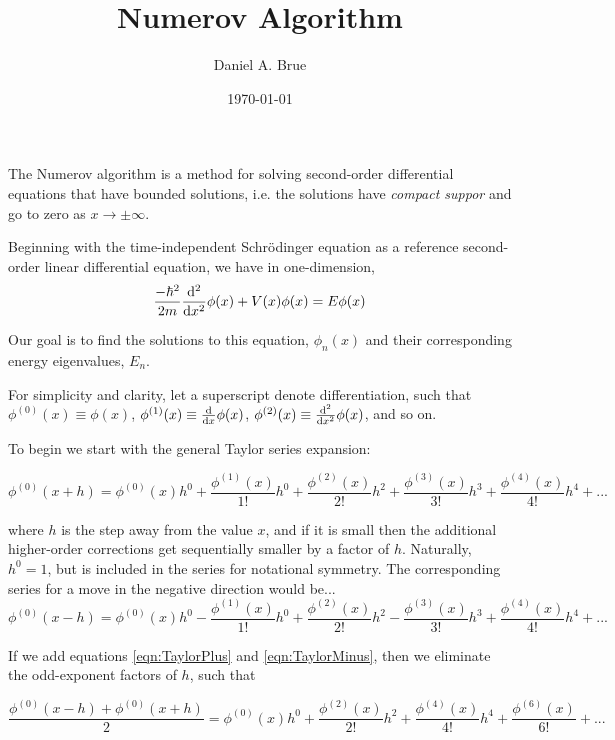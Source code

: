 \documentclass[preprint]{revtex4}
\newcommand{\difx}{\frac{{\rm d}}{{\rm d}x}}
\newcommand{\difxsq}{\frac{{\rm d}^2}{{\rm d}x^2}}
\newcommand{\phid}[1]{\ensuremath{\phi^{(#1)}}}
\begin{document}
\title{Numerov Algorithm}
\author{Daniel A. Brue}
\date{\today}
\maketitle

The Numerov algorithm is a method for solving second-order differential equations that
have bounded solutions, i.e. the solutions have {\it compact suppor} and go to zero
as $x\to\pm\infty$.

Beginning with the time-independent Schr\"odinger equation as a reference 
second-order linear differential equation, we have in one-dimension, 
\begin{equation}
\label{eqn:schrodinger}
\frac{-\hbar^2}{2m}\difxsq \phi(x) +V(x)\phi(x) = E\phi(x)
\end{equation}

Our goal is to find the solutions to this equation, $\phi_n(x)$ and their corresponding
energy eigenvalues, $E_n$. 

For simplicity and clarity, let a superscript denote differentiation, such that
$\phid{0}(x)\equiv\phi(x)$, $\phid{1}(x) \equiv \difx\phi(x)$, $\phid{2}(x) \equiv \difxsq\phi(x)$, and so on. 

To begin we start with the general Taylor series expansion:

\begin{equation}
\label{eqn:TaylorPlus}
    \phid{0}(x+h) = \phid{0}(x)h^0 + \frac{\phid{1}(x)}{1!}h^0 + \frac{\phid{2}(x)}{2!}h^2 + \frac{\phid{3}(x)}{3!}h^3 + \frac{\phid{4}(x)}{4!}h^4 + ...
\end{equation}

where $h$ is the step away from the value $x$, and if it is small then the additional higher-order corrections get sequentially smaller by 
a factor of $h$. Naturally, $h^0 = 1$, but is included in the series for notational symmetry.
The corresponding series for a move in the negative direction would be...
\begin{equation}
\label{eqn:TaylorMinus}
    \phid{0}(x-h) = \phid{0}(x)h^0 - \frac{\phid{1}(x)}{1!}h^0 + \frac{\phid{2}(x)}{2!}h^2 - \frac{\phid{3}(x)}{3!}h^3 + \frac{\phid{4}(x)}{4!}h^4 + ...
\end{equation}

If we add equations \ref{eqn:TaylorPlus} and \ref{eqn:TaylorMinus}, then we eliminate the odd-exponent factors of $h$, such that

\begin{equation}
\label{eqn:TaylorThreePoint0}
    \frac{\phid{0}(x-h) + \phid{0}(x+h)}{2} = \phid{0}(x)h^0 + \frac{\phid{2}(x)}{2!}h^2 + \frac{\phid{4}(x)}{4!}h^4 +  \frac{\phid{6}(x)}{6!} + ...
\end{equation}
\end{document}
